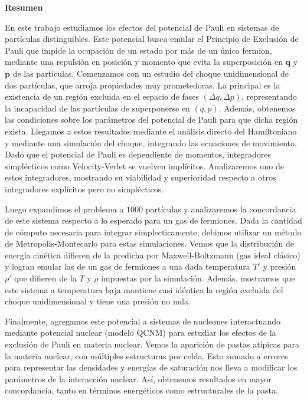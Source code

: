\textbf{\Large Resumen}

\vspace{1cm}

En este trabajo estudiamos los efectos del potencial de Pauli en sistemas de partículas distinguibles.
Este potencial busca emular el Principio de Exclusión de Pauli que impide la ocupación de un estado por más de un único fermion, mediante una repulsión en posición y momento 
que evita la superposición en $\mathbf{q}$ y $\mathbf{p}$ de las partículas.
Comenzamos con un estudio del choque unidimensional de dos partículas, que arroja propiedades muy prometedoras.
La principal es la existencia de un región excluida en el espacio de fases $(\Delta q,\Delta p)$, representando la incapacidad de las partículas de superponerse en $(q,p)$.
Además, obtenemos las condiciones sobre los parámetros del potencial de Pauli para que dicha región exista.
Llegamos a estos resultados mediante el análisis directo del Hamiltoniano y mediante una simulación del choque, integrando las ecuaciones de movimiento.
Dado que el potencial de Pauli es dependiente de momentos, integradores simplécticos como Velocity-Verlet se vuelven implícitos.
Analizaremos uno de estos integradores, mostrando su viabilidad y superioridad respecto a otros integradores explícitos pero no simplécticos.

Luego expandimos el problema a $1000$ partículas y analizaremos la concordancia de este sistema respecto a lo esperado para un gas de fermiones.
Dada la cantidad de cómputo necesaria para integrar simplecticamente, debimos utilizar un método de Metropolis-Montecarlo para estas simulaciones.
Vemos que la distribución de energía cinética difieren de la predicha por Maxwell-Boltzmann (gas ideal clásico) y logran emular las de un gas de fermiones a una dada temperatura $T'$ y 
presión $\rho'$ que difieren de la $T$ y $\rho$ impuestas por la simulación.
Además, mostramos que este sistema a temperatura baja mantiene casi idéntica la región excluida del choque unidimensional y tiene una presión no nula.

Finalmente, agregamos este potencial a sistemas de nucleones interactuando mediante potencial nuclear (modelo QCNM) para estudiar los efectos de la exclusión de Pauli en materia nuclear.
Vemos la aparición de pastas atípicas para la materia nuclear, con múltiples estructuras por celda.
Esto sumado a errores para representar las densidades y energías de saturación nos lleva a modificar los parámetros de la interacción nuclear.
Así, obtenemos resultados en mayor concordancia, tanto en términos energéticos como estructurales de la pasta.